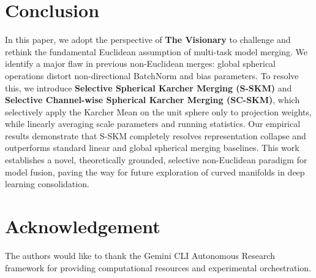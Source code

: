 \documentclass{article}
\begin{document}
\section{Conclusion}
In this paper, we adopt the perspective of \textbf{The Visionary} to challenge and rethink the fundamental Euclidean assumption of multi-task model merging. We identify a major flaw in previous non-Euclidean merges: global spherical operations distort non-directional BatchNorm and bias parameters. To resolve this, we introduce \textbf{Selective Spherical Karcher Merging (S-SKM)} and \textbf{Selective Channel-wise Spherical Karcher Merging (SC-SKM)}, which selectively apply the Karcher Mean on the unit sphere only to projection weights, while linearly averaging scale parameters and running statistics. Our empirical results demonstrate that S-SKM completely resolves representation collapse and outperforms standard linear and global spherical merging baselines. This work establishes a novel, theoretically grounded, selective non-Euclidean paradigm for model fusion, paving the way for future exploration of curved manifolds in deep learning consolidation.

\section*{Acknowledgement}
The authors would like to thank the Gemini CLI Autonomous Research framework for providing computational resources and experimental orchestration.



\end{document}
